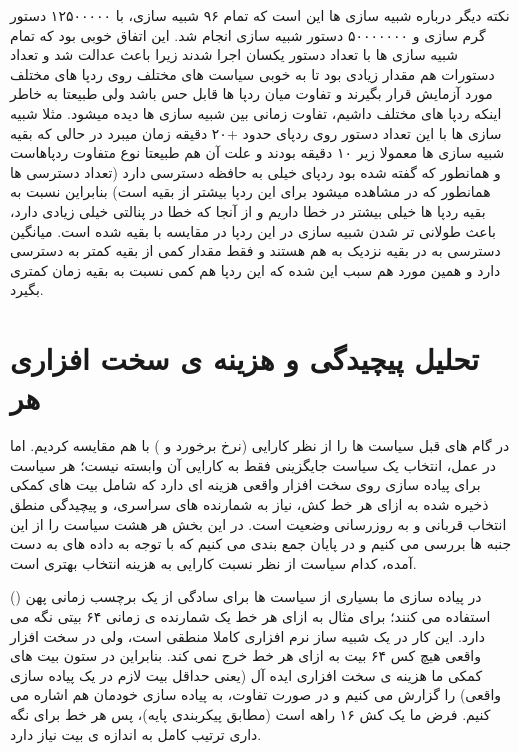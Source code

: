 \documentclass[12pt,a4paper]{article}
\begin{document}
نکته دیگر درباره شبیه سازی ها این است که تمام ۹۶ شبیه سازی، با ۱۲۵۰۰۰۰۰ دستور گرم سازی و ۵۰۰۰۰۰۰۰ دستور شبیه سازی انجام شد. این اتفاق خوبی بود که تمام شبیه سازی ها با تعداد دستور یکسان اجرا شدند زیرا باعث عدالت شد و تعداد دستورات هم مقدار زیادی بود تا به خوبی سیاست های مختلف روی ردپا های مختلف مورد آزمایش قرار بگیرند و تفاوت میان ردپا ها قابل حس باشد ولی طبیعتا به خاطر اینکه ردپا های مختلف داشیم، تفاوت زمانی بین شبیه سازی ها دیده میشود. مثلا شبیه سازی ها با این تعداد دستور روی ردپای  حدود +۲۰ دقیقه زمان میبرد در حالی که بقیه شبیه سازی ها معمولا زیر ۱۰ دقیقه بودند و علت آن هم طبیعتا نوع متفاوت ردپاهاست و همانطور که گفته شده بود ردپای  خیلی به حافظه دسترسی دارد (تعداد دسترسی ها همانطور که در  مشاهده میشود برای این ردپا بیشتر از بقیه است) بنابراین نسبت به بقیه ردپا ها خیلی بیشتر در  خطا داریم و از آنجا که خطا در  پنالتی خیلی زیادی دارد، باعث طولانی تر شدن شبیه سازی در این ردپا در مقایسه با بقیه شده است. میانگین دسترسی به  در بقیه نزدیک به هم هستند و فقط  مقدار کمی از بقیه کمتر به  دسترسی دارد و همین مورد هم سبب این شده که این ردپا هم کمی نسبت به بقیه زمان کمتری بگیرد.

\newpage
\section{تحلیل پیچیدگی و هزینه ی سخت افزاری هر }

در گام های قبل سیاست ها را از نظر کارایی (نرخ برخورد و ) با هم مقایسه کردیم. اما در عمل، انتخاب یک سیاست جایگزینی فقط به کارایی آن وابسته نیست؛ هر سیاست برای پیاده سازی روی سخت افزار واقعی هزینه ای دارد که شامل بیت های کمکی ذخیره شده به ازای هر خط کش، نیاز به شمارنده های سراسری، و پیچیدگی منطق انتخاب قربانی و به روزرسانی وضعیت است. در این بخش هر هشت سیاست را از این جنبه ها بررسی می کنیم و در پایان جمع بندی می کنیم که با توجه به داده های به دست آمده، کدام سیاست از نظر نسبت کارایی به هزینه انتخاب بهتری است.

در پیاده سازی ما بسیاری از سیاست ها برای سادگی از یک برچسب زمانی پهن () استفاده می کنند؛ برای مثال  به ازای هر خط یک شمارنده ی زمانی ۶۴ بیتی نگه می دارد. این کار در یک شبیه ساز نرم افزاری کاملا منطقی است، ولی در سخت افزار واقعی هیچ کس ۶۴ بیت به ازای هر خط خرج نمی کند. بنابراین در ستون بیت های کمکی ما هزینه ی سخت افزاری ایده آل (یعنی حداقل بیت لازم در یک پیاده سازی واقعی) را گزارش می کنیم و در صورت تفاوت، به پیاده سازی خودمان هم اشاره می کنیم. فرض ما یک کش ۱۶ راهه است (مطابق پیکربندی پایه)، پس هر خط برای نگه داری ترتیب کامل به اندازه ی  بیت نیاز دارد.
\end{document}
